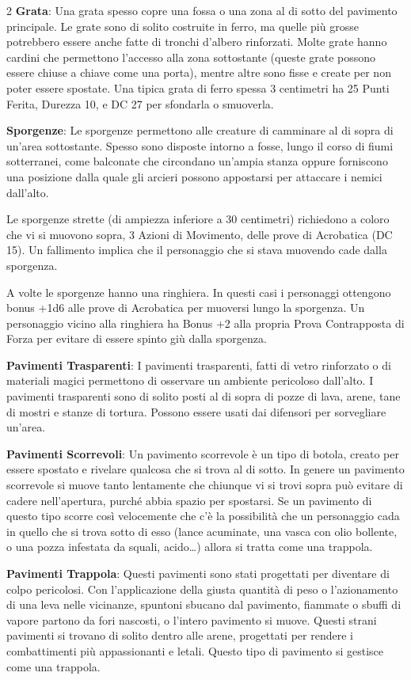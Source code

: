 \begin{multicols}{2}
\textbf{Grata}: Una grata spesso copre una fossa o una zona al di sotto del pavimento principale. Le grate sono di solito costruite in ferro, ma quelle più grosse potrebbero essere anche fatte di tronchi d'albero rinforzati. Molte grate hanno cardini che permettono l'accesso alla zona sottostante (queste grate possono essere chiuse a chiave come una porta), mentre altre sono fisse e create per non poter essere spostate. Una tipica grata di ferro spessa 3 centimetri ha 25 Punti Ferita, Durezza 10, e DC 27 per sfondarla o smuoverla.

\textbf{Sporgenze}: Le sporgenze permettono alle creature di camminare al di sopra di un'area sottostante. Spesso sono disposte intorno a fosse, lungo il corso di fiumi sotterranei, come balconate che circondano un'ampia stanza oppure forniscono una posizione dalla quale gli arcieri possono appostarsi per attaccare i nemici dall'alto.

Le sporgenze strette (di ampiezza inferiore a 30 centimetri) richiedono a coloro che vi si muovono sopra, 3 Azioni di Movimento, delle prove di Acrobatica (DC 15). Un fallimento implica che il personaggio che si stava muovendo cade dalla sporgenza.

A volte le sporgenze hanno una ringhiera. In questi casi i personaggi ottengono bonus +1d6 alle prove di Acrobatica per muoversi lungo la sporgenza. Un personaggio vicino alla ringhiera ha Bonus +2 alla propria Prova Contrapposta di Forza per evitare di essere spinto giù dalla sporgenza.

\textbf{Pavimenti Trasparenti}: I pavimenti trasparenti, fatti di vetro rinforzato o di materiali magici permettono di osservare un ambiente pericoloso dall'alto. I pavimenti trasparenti sono di solito posti al di sopra di pozze di lava, arene, tane di mostri e stanze di tortura. Possono essere usati dai difensori per sorvegliare un'area.

\textbf{Pavimenti Scorrevoli}: Un pavimento scorrevole è un tipo di botola, creato per essere spostato e rivelare qualcosa che si trova al di sotto. In genere un pavimento scorrevole si muove tanto lentamente che chiunque vi si trovi sopra può evitare di cadere nell'apertura, purché abbia spazio per spostarsi. Se un pavimento di questo tipo scorre così velocemente che c'è la possibilità che un personaggio cada in quello che si trova sotto di esso (lance acuminate, una vasca con olio bollente, o una pozza infestata da squali, acido…) allora si tratta come una trappola.

\textbf{Pavimenti Trappola}: Questi pavimenti sono stati progettati per diventare di colpo pericolosi. Con l'applicazione della giusta quantità di peso o l'azionamento di una leva nelle vicinanze, spuntoni sbucano dal pavimento, fiammate o sbuffi di vapore partono da fori nascosti, o l'intero pavimento si muove. Questi strani pavimenti si trovano di solito dentro alle arene, progettati per rendere i combattimenti più appassionanti e letali. Questo tipo di pavimento si gestisce come una trappola.


\end{multicols}
